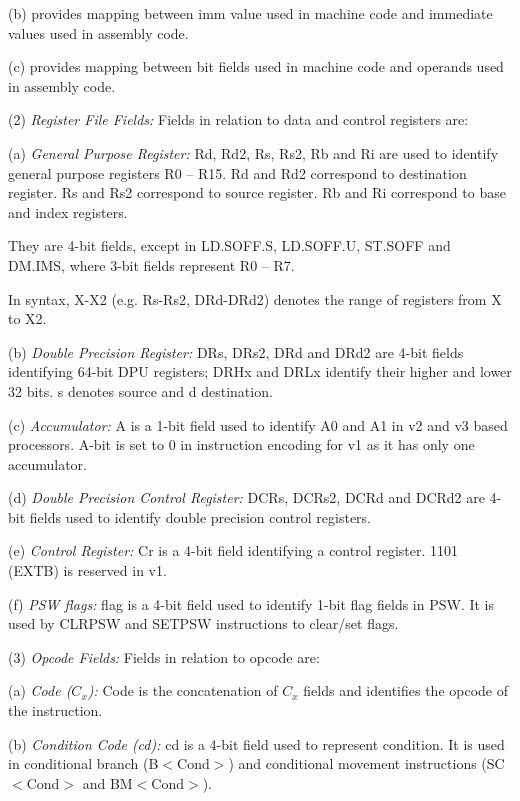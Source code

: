     (b)  provides mapping between imm value 
    used in machine code and immediate values used in assembly code.

    (c)  provides mapping between bit fields 
    used in machine code and operands used in assembly code.

\levelone    
(2) \emph{Register File Fields:} %
Fields in relation to data and control registers are:

    \leveltwo
    (a) \emph{General Purpose Register:} %
    Rd, Rd2, Rs, Rs2, Rb and Ri are used to identify general purpose registers R0 -- R15. Rd and 
    Rd2 correspond to destination register. Rs and Rs2 correspond to source register. Rb and Ri 
    correspond to base and index registers.

    They are 4-bit fields, except in LD.SOFF.S, LD.SOFF.U, ST.SOFF and DM.IMS, where 3-bit fields 
    represent R0 -- R7.

    In syntax, X-X2 (e.g. Rs-Rs2, DRd-DRd2) denotes the range of registers from X to X2.

    (b) \emph{Double Precision Register:} %
    DRs, DRs2, DRd and DRd2 are 4-bit fields identifying 64-bit DPU registers; DRHx and DRLx identify 
    their higher and lower 32 bits. s denotes source and d destination.

    (c) \emph{Accumulator:} %
    A is a 1-bit field used to identify A0 and A1 in v2 and v3 based processors. A-bit is set to 0 in 
    instruction encoding for v1 as it has only one accumulator.

    (d) \emph{Double Precision Control Register:} %
    DCRs, DCRs2, DCRd and DCRd2 are 4-bit fields used to identify double precision control registers. 
    
    (e) \emph{Control Register:} %
    Cr is a 4-bit field identifying a control register. 1101 (EXTB) is reserved in v1. 

    (f) \emph{PSW flags:} %
    flag is a 4-bit field used to identify 1-bit flag fields in PSW. It is used by CLRPSW and SETPSW
    instructions to clear/set flags. 

\levelone    
(3) \emph{Opcode Fields:} %
Fields in relation to opcode are:

    \leveltwo
    (a) \emph{Code ($C_x$):} %
    Code is the concatenation of $C_x$ fields and identifies the opcode of the instruction.

    (b) \emph{Condition Code (cd):} %
    cd is a 4-bit field used to represent condition. It is used in conditional branch (B$<$Cond$>$) and 
    conditional movement instructions (SC$<$Cond$>$ and BM$<$Cond$>$). 

